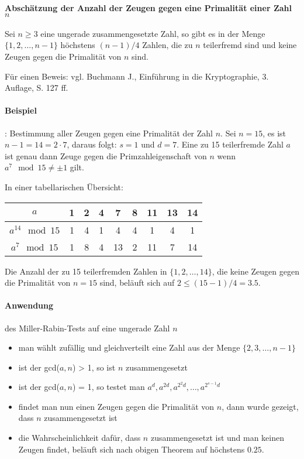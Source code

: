 \paragraph{Abschätzung der Anzahl der Zeugen gegen eine Primalität einer Zahl $n$}

\begin{theorem}
Sei $n \geq 3$ eine ungerade zusammengesetzte Zahl, so gibt es in der Menge
$\{1,2, \ldots, n-1\}$ höchstens $(n-1)/4$ Zahlen, die zu $n$ teilerfremd sind und keine Zeugen gegen die
Primalität von $n$ sind.
\end{theorem}

Für einen Beweis: vgl. Buchmann J., Einführung in die Kryptographie, 3. Auflage, S. 127 ff.

\paragraph{Beispiel}: Bestimmung aller Zeugen gegen eine Primalität der Zahl $n$.
Sei $n = 15$, es ist $n-1 = 14 = 2 \cdot 7$, daraus folgt: $s = 1$ und $d = 7$. Eine zu 15 teilerfremde Zahl $a$ ist genau dann Zeuge gegen die Primzahleigenschaft
von $n$ wenn $a^7 \mod 15 \neq \pm 1$ gilt.

In einer tabellarischen Übersicht:


\begin{center}
    \begin{tabular}{ ccc ccc ccc } 
        \hline
        $a$ & 1 & 2 & 4 & 7 & 8 & 11 & 13 & 14 \\ 
        \hline
        $a^{14} \mod 15$ &  1 &  4 &  1 &  4 &  4 &  1 &  4 &  1 \\
        $a^{ 7} \mod 15$ &  1 &  8 &  4 & 13 &  2 & 11 &  7 & 14 \\ 
        \hline
    \end{tabular}
\end{center}

Die Anzahl der zu 15 teilerfremden Zahlen in $\{1, 2,\dots,14\}$, die keine Zeugen gegen die
Primalität von $n = 15$ sind, beläuft sich auf $2 \leq (15 - 1)/4 = 3.5$.

\paragraph{Anwendung} des Miller-Rabin-Tests auf eine ungerade Zahl $n$

\begin{itemize}
    \item man wählt zufällig und gleichverteilt eine Zahl aus der Menge $\{2,3,\dots, n-1\}$
    \item ist der gcd($a,n$) > 1, so ist $n$ zusammengesetzt
    \item ist der gcd($a,n$) = 1, so testet man $a^d, a^{2d}, a^{2^2d}, \ldots, a^{2^{s-1}d}$
    \item findet man nun einen Zeugen gegen die Primalität von $n$, dann wurde gezeigt, dass $n$ zusammengesetzt ist
    \item die Wahrscheinlichkeit dafür, dass $n$ zusammengesetzt ist und man keinen Zeugen findet, beläuft sich nach obigen Theorem auf höchstens $0.25$.
\end{itemize}

